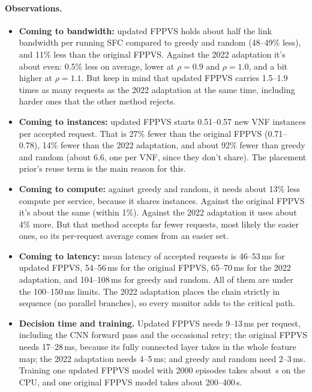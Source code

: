 \paragraph{Observations.}
\begin{itemize}
  \item \textbf{Coming to bandwidth:} updated FPPVS holds about half the link
  bandwidth per running SFC compared to greedy and random (48--49\% less), and
  11\% less than the original FPPVS. Against the 2022 adaptation it's about
  even: 0.5\% less on average, lower at $\rho=0.9$ and $\rho=1.0$, and a bit
  higher at $\rho=1.1$. But keep in mind that updated FPPVS carries 1.5--1.9
  times as many requests as the 2022 adaptation at the same time, including
  harder ones that the other method rejects.
  \item \textbf{Coming to instances:} updated FPPVS starts 0.51--0.57 new VNF
  instances per accepted request. That is 27\% fewer than the original FPPVS
  (0.71--0.78), 14\% fewer than the 2022 adaptation, and about 92\% fewer than
  greedy and random (about 6.6, one per VNF, since they don't share). The
  placement prior's reuse term is the main reason for this.
  \item \textbf{Coming to compute:} against greedy and random, it needs about
  13\% less compute per service, because it shares instances. Against the
  original FPPVS it's about the same (within 1\%). Against the 2022 adaptation
  it uses about 4\% more. But that method accepts far fewer requests, most
  likely the easier ones, so its per-request average comes from an easier set.
  \item \textbf{Coming to latency:} mean latency of accepted requests is
  46--53\,ms for updated FPPVS, 54--56\,ms for the original FPPVS, 65--70\,ms for
  the 2022 adaptation, and 104--108\,ms for greedy and random. All of them are
  under the 100--150\,ms limits. The 2022 adaptation places the chain strictly in
  sequence (no parallel branches), so every monitor adds to the critical path.
  \item \textbf{Decision time and training.} Updated FPPVS needs 9--13\,ms per
  request, including the CNN forward pass and the occasional retry; the original
  FPPVS needs 17--28\,ms, because its fully connected layer takes in the whole
  feature map; the 2022 adaptation needs 4--5\,ms; and greedy and random need
  2--3\,ms. Training one updated FPPVS model with 2000 episodes takes about
  \trainSeconds\,s on the CPU, and one original FPPVS model takes about
  200--400\,s.
\end{itemize}

